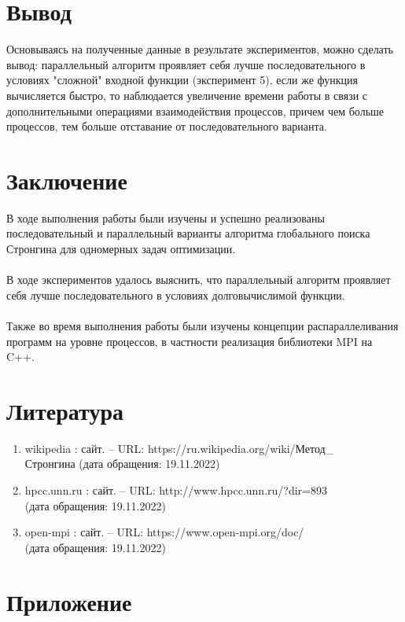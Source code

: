 \documentclass[14pt, a4paper]{extarticle}
\begin{document}
	\newpage

	\section{Вывод}
	Основываясь на полученные данные в результате экспериментов, можно сделать вывод: параллельный алгоритм проявляет себя лучше последовательного в условиях "сложной" входной функции (эксперимент 5), если же функция вычисляется быстро, то наблюдается увеличение времени работы в связи с дополнительными операциями взаимодействия процессов, причем чем больше процессов, тем больше отставание от последовательного варианта.

	\newpage

	\section{Заключение}
	В ходе выполнения работы были изучены и успешно реализованы\\ последовательный и параллельный варианты алгоритма глобального поиска Стронгина для одномерных задач оптимизации.\\\\
	В ходе экспериментов удалось выяснить, что параллельный алгоритм проявляет себя лучше последовательного в условиях долговычислимой функции.\\\\
	Также во время выполнения работы были изучены концепции распараллеливания программ на уровне процессов, в частности реализация библиотеки MPI на C++.
 
	\newpage

	\section{Литература}
	\begin{enumerate}
		\item wikipedia : сайт. – URL: https://ru.wikipedia.org/wiki/Метод\_\\Стронгина (дата обращения: 19.11.2022)
		\item hpcc.unn.ru : сайт. – URL: http://www.hpcc.unn.ru/?dir=893\\(дата обращения: 19.11.2022)
		\item open-mpi : сайт. – URL: https://www.open-mpi.org/doc/\\(дата обращения: 19.11.2022)
	\end{enumerate}
	\newpage

	\section{Приложение}
\end{document}
